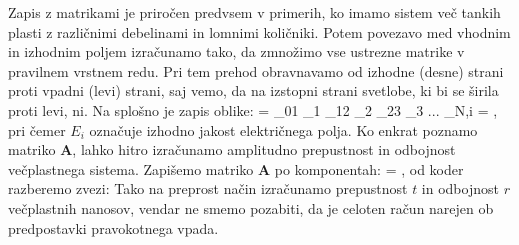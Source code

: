 Zapis z matrikami je priročen predvsem v primerih, ko imamo sistem več tankih plasti
z različnimi debelinami in lomnimi količniki. Potem povezavo med vhodnim in izhodnim poljem
izračunamo tako, da zmnožimo vse ustrezne matrike v pravilnem vrstnem redu. Pri tem 
prehod obravnavamo od izhodne (desne) strani proti vpadni (levi) strani, saj vemo, da na
izstopni strani svetlobe, ki bi se širila proti levi, ni. Na splošno je zapis oblike:
\beq
\left[\begin{array}{c}
E_{0}\\
E_{0}'\\
\end{array}\right] = 
_{01}
_1
_{12}
_2
_{23}
_3 ... _{N,i}
\left[\begin{array}{c}
E_i\\
0\\
\end{array}\right] =
\left[\begin{array}{c}
E_i\\
0\\
\end{array}\right]\!\!,
\label{eq:06_63}
\eeq
pri čemer $E_i$ označuje izhodno jakost električnega polja. Ko enkrat 
poznamo matriko $\mathbf{A}$, lahko hitro izračunamo amplitudno 
prepustnost in odbojnost večplastnega sistema. Zapišemo matriko 
$\mathbf{A}$ po komponentah:
\beq
\left[\begin{array}{c}
E_{0}\\
E_{0}'\\
\end{array}\right] =
\left[\begin{array}{cc}
A_{11}& A_{12}\\
A_{21}& A_{22}\\
\end{array}\right]\cdot
\left[\begin{array}{c}
E_i\\
0\\
\end{array}\right]\!\!,
\label{eq:06_64}
\eeq
od koder razberemo zvezi:
Tako na preprost način izračunamo prepustnost $t$ in odbojnost $r$ 
večplastnih nanosov, vendar ne smemo pozabiti, 
da je celoten račun narejen ob predpostavki pravokotnega vpada.

